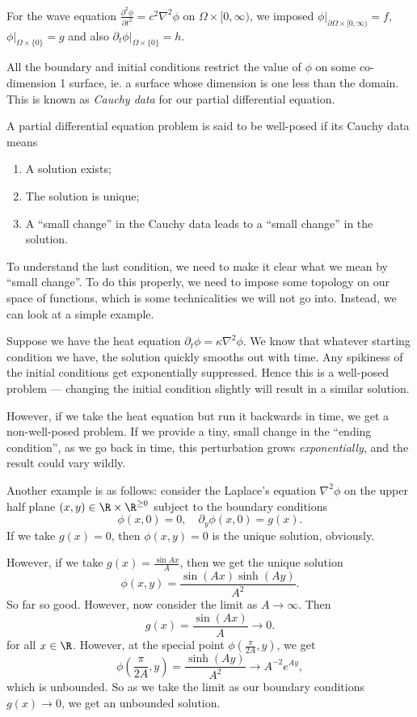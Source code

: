 \documentclass[a4paper]{article}
\begin{document}
For the wave equation $\frac{\partial^2 \phi}{\partial t^2} = c^2 \nabla^2 \phi$ on $\Omega \times [0, \infty)$, we imposed $\phi|_{\partial \Omega \times [0, \infty)} = f$, $\phi|_{\Omega \times \{0\}} = g$ and also $\partial_t \phi|_{\Omega \times \{0\}} = h$.

All the boundary and initial conditions restrict the value of $\phi$ on some co-dimension 1 surface, ie. a surface whose dimension is one less than the domain. This is known as \emph{Cauchy data} for our partial differential equation.

\begin{defi}
  A partial differential equation problem is said to be well-posed if its Cauchy data means
  \begin{enumerate}
    \item A solution exists;
    \item The solution is unique;
    \item A ``small change'' in the Cauchy data leads to a ``small change'' in the solution.
  \end{enumerate}
\end{defi}
To understand the last condition, we need to make it clear what we mean by ``small change''. To do this properly, we need to impose some topology on our space of functions, which is some technicalities we will not go into. Instead, we can look at a simple example.

Suppose we have the heat equation $\partial_t \phi = \kappa \nabla^2 \phi$. We know that whatever starting condition we have, the solution quickly smooths out with time. Any spikiness of the initial conditions get exponentially suppressed. Hence this is a well-posed problem --- changing the initial condition slightly will result in a similar solution.

However, if we take the heat equation but run it backwards in time, we get a non-well-posed problem. If we provide a tiny, small change in the ``ending condition'', as we go back in time, this perturbation grows \emph{exponentially}, and the result could vary wildly.

Another example is as follows: consider the Laplace's equation $\nabla^2 \phi$ on the upper half plane $(x, y) \in \R \times \R^{\geq 0}$ subject to the boundary conditions
\[
  \phi(x, 0) = 0,\quad \partial_y \phi(x, 0) = g(x).
\]
If we take $g(x) = 0$, then $\phi(x, y) = 0$ is the unique solution, obviously.

However, if we take $g(x) = \frac{\sin Ax}{A}$, then we get the unique solution
\[
  \phi(x, y) = \frac{\sin (Ax) \sinh (Ay)}{A^2}.
\]
So far so good. However, now consider the limit as $A \to \infty$. Then
\[
  g(x) = \frac{\sin (Ax)}{A} \to 0.
\]
for all $x \in \R$. However, at the special point $\phi\left(\frac{\pi}{2A}, y\right)$, we get
\[
  \phi\left(\frac{\pi}{2A}, y\right) = \frac{\sinh (Ay)}{A^2} \to A^{-2} e^{Ay},
\]
which is unbounded. So as we take the limit as our boundary conditions $g(x) \to 0$, we get an unbounded solution.
\end{document}
